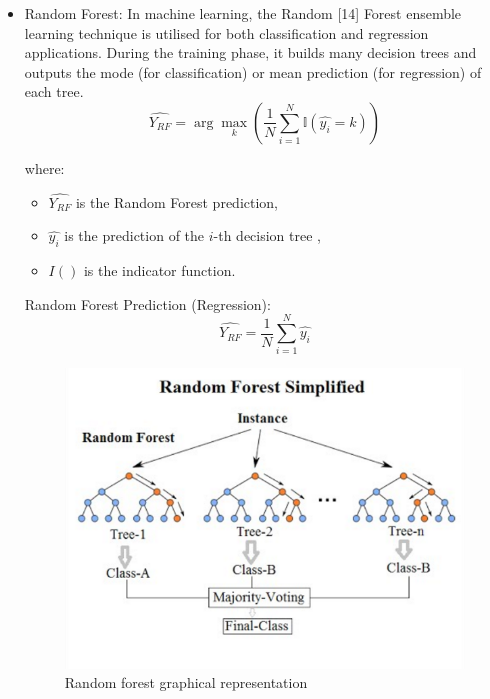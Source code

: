 \documentclass[conference]{IEEEtran}
\begin{document}
\begin{itemize}
\item Random Forest: In machine learning, the Random [14] Forest ensemble learning technique is utilised for both classification and regression applications. During the training phase, it builds many decision trees and outputs the mode (for classification) or mean prediction (for regression) of each tree. 
\begin{equation}
    \hat{Y_{RF}} = \arg\max_k \left( \frac{1}{N} \sum_{i=1}^{N} \mathbb{I}(\hat{y_i}=k) \right)
\end{equation}

where:
\begin{itemize}
    \item $\hat{Y_{RF}}$ is the Random Forest prediction,
    \item $\hat{y_i}$ is the prediction of the $i$-th decision tree ,
    \item $I()$ is the indicator function. 
\end{itemize}
Random Forest Prediction (Regression): 
\begin{equation}
    \hat{Y_{RF}} =  \frac{1}{N} \sum_{i=1}^{N}\hat{y_i}
\end{equation}

\begin{figure}[htbp]
\centering
\includegraphics[scale=0.35]{Fig5.png}
\caption{Random forest graphical representation }
\label{fig}
\end{figure}


\end{itemize}
\end{document}
